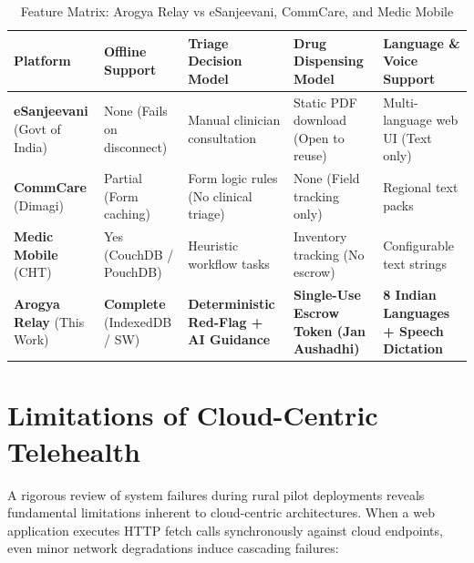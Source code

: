 \documentclass[12pt,a4paper,oneside]{report}
\begin{document}
\begin{table}[!htbp]
\centering
\small
\renewcommand{\arraystretch}{1.3}
\begin{tabularx}{\textwidth}{L{2.5cm} L{2.2cm} Y L{2.5cm} Y}
\toprule
\textbf{Platform} & \textbf{Offline Support} & \textbf{Triage Decision Model} & \textbf{Drug Dispensing Model} & \textbf{Language \& Voice Support} \\
\midrule
\textbf{eSanjeevani} (Govt of India) \cite{esanjeevani2023} & None (Fails on disconnect) & Manual clinician consultation & Static PDF download (Open to reuse) & Multi-language web UI (Text only) \\
\textbf{CommCare} (Dimagi) \cite{commcare2021} & Partial (Form caching) & Form logic rules (No clinical triage) & None (Field tracking only) & Regional text packs \\
\textbf{Medic Mobile} (CHT) \cite{medic2022} & Yes (CouchDB / PouchDB) & Heuristic workflow tasks & Inventory tracking (No escrow) & Configurable text strings \\
\textbf{Arogya Relay} (This Work) & \textbf{Complete} (IndexedDB / SW) & \textbf{Deterministic Red-Flag + AI Guidance} & \textbf{Single-Use Escrow Token (Jan Aushadhi)} & \textbf{8 Indian Languages + Speech Dictation} \\
\bottomrule
\end{tabularx}
\caption{Feature Matrix: Arogya Relay vs eSanjeevani, CommCare, and Medic Mobile}
\label{tab:lit_comparison}
\end{table}

\section{Limitations of Cloud-Centric Telehealth}
A rigorous review of system failures during rural pilot deployments reveals fundamental limitations inherent to cloud-centric architectures. When a web application executes HTTP fetch calls synchronously against cloud endpoints, even minor network degradations induce cascading failures:
\end{document}
